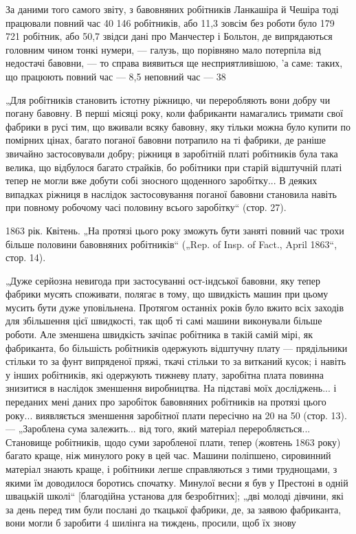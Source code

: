 За даними того самого звіту, з бавовняних робітників Ланкашіра
й Чешіра тоді працювали повний час 40 146 робітників,
або 11,3%
зовсім без роботи було 179 721 робітник, або 50,7%
звідси дані про Манчестер і Больтон, де випрядаються
головним чином тонкі нумери, — галузь, що порівняно мало потерпіла
від недостачі бавовни, — то справа виявиться ще несприятливішою, 'а
саме: таких, що працюють повний час — 8,5%
неповний час — 38%

„Для робітників становить істотну ріжницю, чи переробляють
вони добру чи погану бавовну. В перші місяці року, коли фабриканти
намагались тримати свої фабрики в русі тим, що вживали
всяку бавовну, яку тільки можна було купити по помірних цінах,
багато поганої бавовни потрапило на ті фабрики, де раніше звичайно
застосовували добру; ріжниця в заробітній платі робітників
була така велика, що відбулося багато страйків, бо робітники
при старій відштучній платі тепер не могли вже добути
собі зносного щоденного заробітку... В деяких випадках ріжниця
в наслідок застосовування поганої бавовни становила навіть при
повному робочому часі половину всього заробітку“ (стор. 27).

1863 рік. Квітень. „На протязі цього року зможуть бути заняті
повний час трохи більше половини бавовняних робітників“
(„Rep. of Insp. of Fact., April 1863“, стор. 14).

„Дуже серйозна невигода при застосуванні ост-індської бавовни,
яку тепер фабрики мусять споживати, полягає в тому,
що швидкість машин при цьому мусить бути дуже уповільнена.
Протягом останніх років було вжито всіх заходів для збільшення
цієї швидкості, так щоб ті самі машини виконували більше
роботи. Але зменшена швидкість зачіпає робітника в такій самій
мірі, як фабриканта, бо більшість робітників одержують відштучну
плату — прядільники стільки то за фунт випряденої
пряжі, ткачі стільки то за витканий кусок; і навіть у інших
робітників, які одержують тижневу плату, заробітна плата повинна
знизитися в наслідок зменшення виробництва. На підставі
моїх досліджень... і переданих мені даних про заробіток бавовняних
робітників на протязі цього року... виявляється зменшення
заробітної плати пересічно на 20%
на 50%
(стор. 13). — „Зароблена сума залежить... від того, який матеріал
переробляється... Становище робітників, щодо суми заробленої
плати, тепер (жовтень 1863 року) багато краще, ніж минулого
року в цей час. Машини поліпшено, сировинний матеріал
знають краще, і робітники легше справляються з тими труднощами,
з якими їм доводилося боротись спочатку. Минулої весни
я був у Престоні в одній швацькій школі“ [благодійна установа
для безробітних]; „дві молоді дівчини, які за день перед тим
були послані до ткацької фабрики, де, за заявою фабриканта, вони
могли б заробити 4 шилінга на тиждень, просили, щоб їх знову
